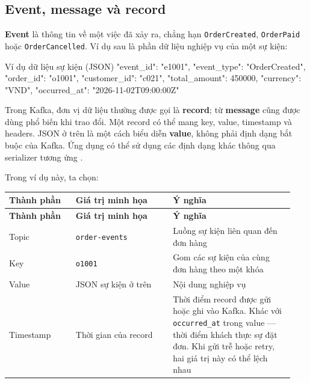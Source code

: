 \FloatBarrier
{}
\subsection{Event, message và record}

\textbf{Event} là thông tin về một việc đã xảy ra, chẳng hạn \texttt{OrderCreated}, \texttt{OrderPaid} hoặc \texttt{OrderCancelled}. Ví dụ sau là phần dữ liệu nghiệp vụ của một sự kiện:


\begin{aivncodebox}[language={}]{Ví dụ dữ liệu sự kiện (JSON)}
{
  "event_id": "e1001",
  "event_type": "OrderCreated",
  "order_id": "o1001",
  "customer_id": "c021",
  "total_amount": 450000,
  "currency": "VND",
  "occurred_at": "2026-11-02T09:00:00Z"
}
\end{aivncodebox}

Trong Kafka, đơn vị dữ liệu thường được gọi là \textbf{record}; từ \textbf{message} cũng được dùng phổ biến khi trao đổi. Một record có thể mang key, value, timestamp và headers. JSON ở trên là một cách biểu diễn \textbf{value}, không phải định dạng bắt buộc của Kafka. Ứng dụng có thể sử dụng các định dạng khác thông qua serializer tương ứng \cite{kafka-producerrecord, kafka-producer-configs}.


Trong ví dụ này, ta chọn:


\begingroup\small
\renewcommand{\arraystretch}{1.23}
\begin{longtable}{@{}p{0.22\linewidth}p{0.32\linewidth}p{0.4\linewidth}@{}}
\toprule
\rowcolor{rowLavender}
\textbf{Thành phần} & \textbf{Giá trị minh họa} & \textbf{Ý nghĩa} \\
\midrule
\endfirsthead
\toprule
\rowcolor{rowLavender}
\textbf{Thành phần} & \textbf{Giá trị minh họa} & \textbf{Ý nghĩa} \\
\midrule
\endhead
\bottomrule
\endfoot
Topic & \texttt{order-\allowbreak{}events} & Luồng sự kiện liên quan đến đơn hàng \\
Key & \texttt{o1001} & Gom các sự kiện của cùng đơn hàng theo một khóa \\
Value & JSON sự kiện ở trên & Nội dung nghiệp vụ \\
Timestamp & Thời gian của record & Thời điểm record được gửi hoặc ghi vào Kafka. Khác với \texttt{occurred\_\allowbreak{}at} trong value --- thời điểm khách thực sự đặt đơn. Khi gửi trễ hoặc retry, hai giá trị này có thể lệch nhau \\
\end{longtable}
\endgroup

